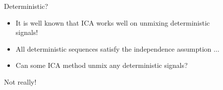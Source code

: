 \documentclass[final]{beamer} %
\begin{document}
\begin{frame}[c]
\begin{columns}[t,totalwidth=\textwidth]
\begin{column}{.24\textwidth}
	\end{column}
	\begin{column}{0.01\textwidth}
	\end{column}
	
	\begin{column}{.24\textwidth}%
		\begin{block}{Deterministic?}
			\begin{itemize}
				\item It is well known that ICA works well on unmixing deterministic signals!
				\item All deterministic sequences satisfy the independence assumption $\dots$
				\item Can some ICA method unmix \alert{any} deterministic signals?
			\end{itemize}
			\begin{center}
				{\large Not really!}
			\end{center}
			

\end{block}
\end{column}
\end{columns}
\end{frame}
\end{document}
